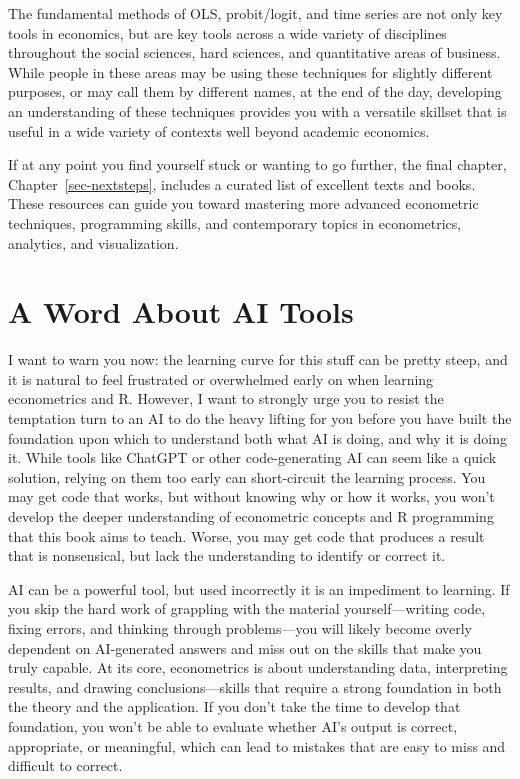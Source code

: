 \documentclass[
  letterpaper,
]{book}
\begin{document}
The fundamental methods of OLS, probit/logit, and time series are not
only key tools in economics, but are key tools across a wide variety of
disciplines throughout the social sciences, hard sciences, and
quantitative areas of business. While people in these areas may be using
these techniques for slightly different purposes, or may call them by
different names, at the end of the day, developing an understanding of
these techniques provides you with a versatile skillset that is useful
in a wide variety of contexts well beyond academic economics.

If at any point you find yourself stuck or wanting to go further, the
final chapter, Chapter~\ref{sec-nextsteps}, includes a curated list of
excellent texts and books. These resources can guide you toward
mastering more advanced econometric techniques, programming skills, and
contemporary topics in econometrics, analytics, and visualization.

\section{A Word About AI Tools}\label{a-word-about-ai-tools}

I want to warn you now: the learning curve for this stuff can be pretty
steep, and it is natural to feel frustrated or overwhelmed early on when
learning econometrics and R. However, I want to strongly urge you to
resist the temptation turn to an AI to do the heavy lifting for you
before you have built the foundation upon which to understand both what
AI is doing, and why it is doing it. While tools like ChatGPT or other
code-generating AI can seem like a quick solution, relying on them too
early can short-circuit the learning process. You may get code that
works, but without knowing why or how it works, you won't develop the
deeper understanding of econometric concepts and R programming that this
book aims to teach. Worse, you may get code that produces a result that
is nonsensical, but lack the understanding to identify or correct it.

AI can be a powerful tool, but used incorrectly it is an impediment to
learning. If you skip the hard work of grappling with the material
yourself---writing code, fixing errors, and thinking through
problems---you will likely become overly dependent on AI-generated
answers and miss out on the skills that make you truly capable. At its
core, econometrics is about understanding data, interpreting results,
and drawing conclusions---skills that require a strong foundation in
both the theory and the application. If you don't take the time to
develop that foundation, you won't be able to evaluate whether AI's
output is correct, appropriate, or meaningful, which can lead to
mistakes that are easy to miss and difficult to correct.
\end{document}
